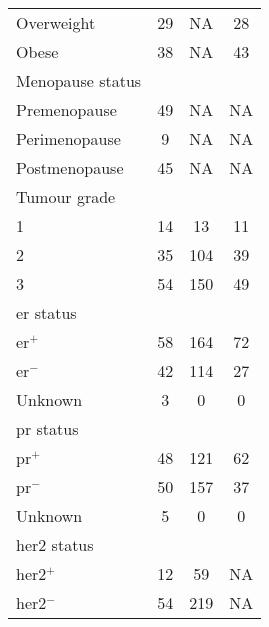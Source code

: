 \begin{ThreePartTable}
\begin{longtable}{lccc}
		\hspace{1em} Overweight              & 29 & NA & 28 \\
		\hspace{1em} Obese                   & 38 & NA & 43 \\
		\hline
		\rule{0pt}{2.25ex}Menopause status  \\
		\hspace{1em} Premenopause            & 49 & NA & NA\\
		\hspace{1em} Perimenopause           & 9  & NA & NA \\
		\hspace{1em} Postmenopause           & 45 & NA & NA \\
		\hline
		\rule{0pt}{2.25ex}Tumour grade      \\
		\hspace{1em} 1                       & 14 & 13 & 11 \\
		\hspace{1em} 2                       & 35 & 104 & 39 \\
		\hspace{1em} 3                       & 54 & 150 & 49 \\
		\hline
		\rule{0pt}{2.25ex}\gls{er} status   \\
		\hspace{1em} \gls{er}$^+$            & 58 & 164 & 72 \\
		\hspace{1em} \gls{er}$^-$            & 42 & 114 & 27 \\
		\hspace{1em} Unknown                 & 3  & 0  & 0  \\
		\hline
		\rule{0pt}{2.25ex}\gls{pr} status   \\
		\hspace{1em} \gls{pr}$^+$            & 48 & 121 & 62 \\
		\hspace{1em} \gls{pr}$^-$            & 50 & 157 & 37 \\
		\hspace{1em} Unknown                 & 5  & 0  & 0  \\
		\hline
		\rule{0pt}{2.25ex}\gls{her2} status \\
		\hspace{1em} \gls{her2}$^+$          & 12 & 59 & NA \\
		\hspace{1em} \gls{her2}$^-$          & 54 & 219 & NA \\

\end{longtable}
\end{ThreePartTable}

